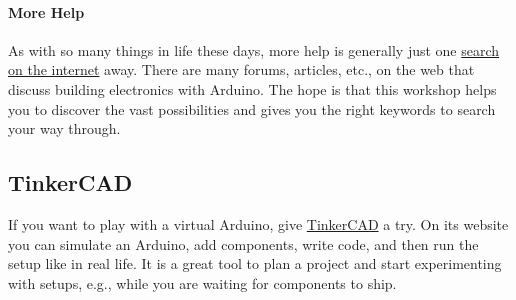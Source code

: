 \paragraph{More Help}{As with so many things in life these days, more help is generally just one \href{https://www.duckduckgo.com}{search on the internet} away. There are many forums, articles, etc., on the web that discuss building electronics with Arduino. The hope is that this workshop helps you to discover the vast possibilities and gives you the right keywords to search your way through.}


\subsection{TinkerCAD}

If you want to play with a virtual Arduino, give \href{https://www.tinkercad.com/}{TinkerCAD} a try. On its website you can simulate an Arduino, add components, write code, and then run the setup like in real life. It is a great tool to plan a project and start experimenting with setups, e.g., while you are waiting for components to ship.